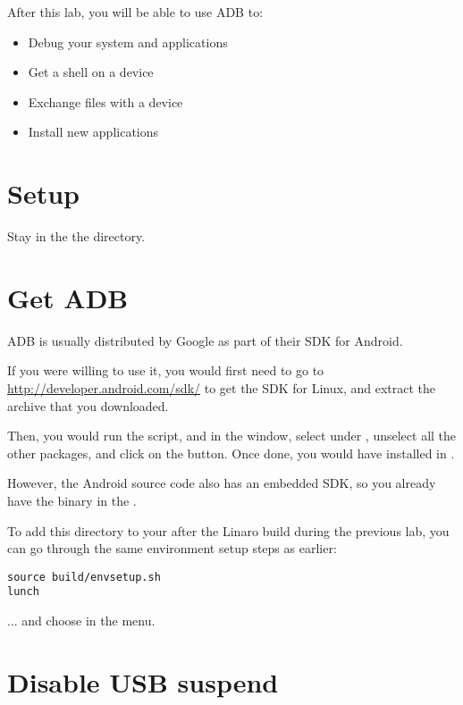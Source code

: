 
After this lab, you will be able to use ADB to:
\begin{itemize}
  \item Debug your system and applications
  \item Get a shell on a device
  \item Exchange files with a device
  \item Install new applications
\end{itemize}

\section{Setup}

Stay in the the  directory.

\section{Get ADB}

ADB is usually distributed by Google as part of their SDK for Android.

If you were willing to use it, you would first need to go to
\url{http://developer.android.com/sdk/} to get the SDK for Linux, and
extract the archive that you downloaded.

Then, you would run the  script, and in the
 window, select  under
, unselect all the other packages, and click on the
 button.  Once done, you would have
 installed in .

However, the Android source code also has an embedded SDK, so you
already have the  binary in the .

To add this directory to your  after the Linaro build 
during the previous lab, you can go through the same environment setup steps
as earlier:

\begin{verbatim}
source build/envsetup.sh
lunch
\end{verbatim}

... and choose  in the  menu.

\section{Disable USB suspend}

